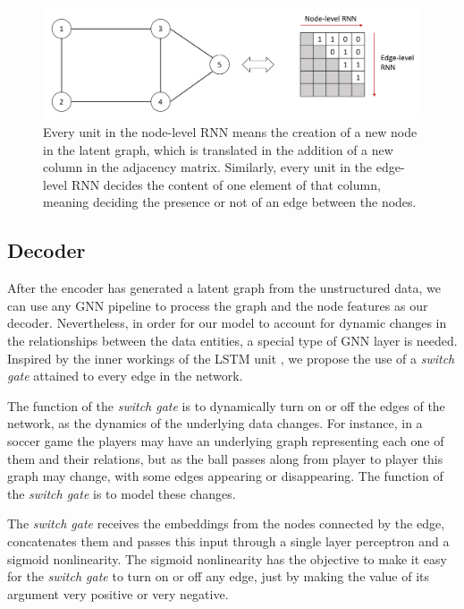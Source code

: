 \documentclass[12pt,a4paper]{article}
\begin{document}
	
	\begin{figure}[hbtp]
	\includegraphics[width=\textwidth]{rnn_adj.png}
	\caption{Every unit in the node-level RNN means the creation of a new node in the latent graph, which is translated in the addition of a new column in the adjacency matrix. Similarly, every unit in the edge-level RNN decides the content of one element of that column, meaning deciding the presence or not of an edge between the nodes. \label{rnn2}}
	\end{figure}

	
	\subsection{Decoder}
	
	After the encoder has generated a latent graph from the unstructured data, we can use any GNN pipeline to process the graph and the node features as our decoder. Nevertheless, in order for our model to account for dynamic changes in the relationships between the data entities, a special type of GNN layer is needed. Inspired by the inner workings of the LSTM unit \citep{HochreiterandSchmidhuber1997}, we propose the use of a \emph{switch gate} attained to every edge in the network.
	
	The function of the \emph{switch gate} is to dynamically turn on or off the edges of the network, as the dynamics of the underlying data changes. For instance, in a soccer game the players may have an underlying graph representing each one of them and their relations, but as the ball passes along from player to player this graph may change, with some edges appearing or disappearing. The function of the \emph{switch gate} is to model these changes.
	
	The \emph{switch gate} receives the embeddings from the nodes connected by the edge, concatenates them and passes this input through a single layer perceptron and a sigmoid nonlinearity. The sigmoid nonlinearity has the objective to make it easy for the \emph{switch gate} to turn on or off any edge, just by making the value of its argument very positive or very negative.
	
\end{document}
